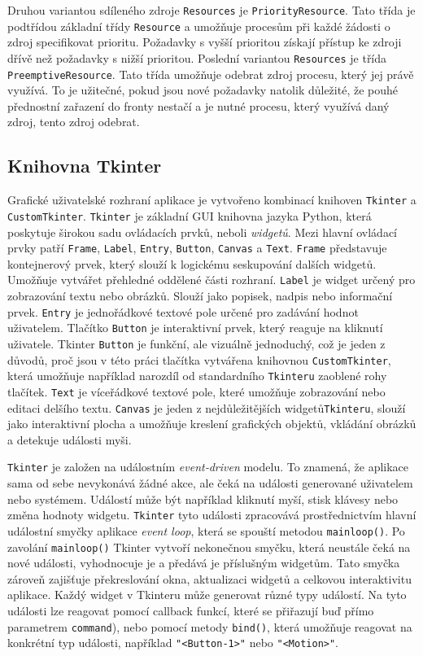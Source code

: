 \documentclass[
  program=itp,
  biblatex,
  figures=false,
  glossaries,
  index
]{kidiplom}
\begin{document}
Druhou variantou sdíleného zdroje \texttt{Resources} je \texttt{PriorityResource}. Tato třída je podtřídou základní třídy \texttt{Resource} a umožňuje procesům při každé žádosti o zdroj specifikovat prioritu. Požadavky s vyšší prioritou získají přístup ke zdroji dřívě než požadavky s nižší prioritou. Poslední variantou \texttt{Resources} je třída \texttt{PreemptiveResource}. Tato třída umožňuje odebrat zdroj procesu, který jej právě využívá. To je užitečné, pokud jsou nové požadavky natolik důležité, že pouhé přednostní zařazení do fronty nestačí a je nutné procesu, který využívá daný zdroj, tento zdroj odebrat.

\subsection{Knihovna Tkinter}
Grafické uživatelské rozhraní aplikace je vytvořeno kombinací knihoven \texttt{Tkinter} a \texttt{CustomTkinter}. \texttt{Tkinter} je základní GUI knihovna jazyka Python, která poskytuje širokou sadu ovládacích prvků, neboli \emph{widgetů}. Mezi hlavní ovládací prvky patří \texttt{Frame}, \texttt{Label}, \texttt{Entry}, \texttt{Button}, \texttt{Canvas} a \texttt{Text}. \texttt{Frame} představuje kontejnerový prvek, který slouží k logickému seskupování dalších widgetů. Umožňuje vytvářet přehledné oddělené části rozhraní. \texttt{Label} je widget určený pro zobrazování textu nebo obrázků. Slouží jako popisek, nadpis nebo informační prvek. \texttt{Entry} je jednořádkové textové pole určené pro zadávání hodnot uživatelem. Tlačítko \texttt{Button} je interaktivní prvek, který reaguje na kliknutí uživatele. Tkinter \texttt{Button} je funkční, ale vizuálně jednoduchý, což je jeden z důvodů, proč jsou v této práci tlačítka vytvářena knihovnou \texttt{CustomTkinter}, která umožňuje například narozdíl od standardního \texttt{Tkinteru} zaoblené rohy tlačítek. \texttt{Text} je víceřádkové textové pole, které umožňuje zobrazování nebo editaci delšího textu. \texttt{Canvas} je jeden z nejdůležitějších widgetů\texttt{Tkinteru}, slouží jako interaktivní plocha a umožňuje kreslení grafických objektů, vkládání obrázků a detekuje události myši.

\texttt{Tkinter} je založen na událostním \emph{event‑driven} modelu. To znamená, že aplikace sama od sebe nevykonává žádné akce, ale čeká na události generované uživatelem nebo systémem. Událostí může být například kliknutí myší, stisk klávesy nebo změna hodnoty widgetu. \texttt{Tkinter} tyto události zpracovává prostřednictvím hlavní událostní smyčky aplikace \emph{event loop}, která se spouští metodou \texttt{mainloop()}. Po zavolání \texttt{mainloop()} Tkinter vytvoří nekonečnou smyčku, která neustále čeká na nové události, vyhodnocuje je a předává je příslušným widgetům. Tato smyčka zároveň zajišťuje překreslování okna, aktualizaci widgetů a celkovou interaktivitu aplikace.
Každý widget v Tkinteru může generovat různé typy událostí. Na tyto události lze reagovat pomocí callback funkcí, které se přiřazují buď přímo parametrem \texttt{command}), nebo pomocí metody \texttt{bind()}, která umožňuje reagovat na konkrétní typ události, například \texttt{"<Button-1>"} nebo \texttt{"<Motion>"}.
\end{document}
